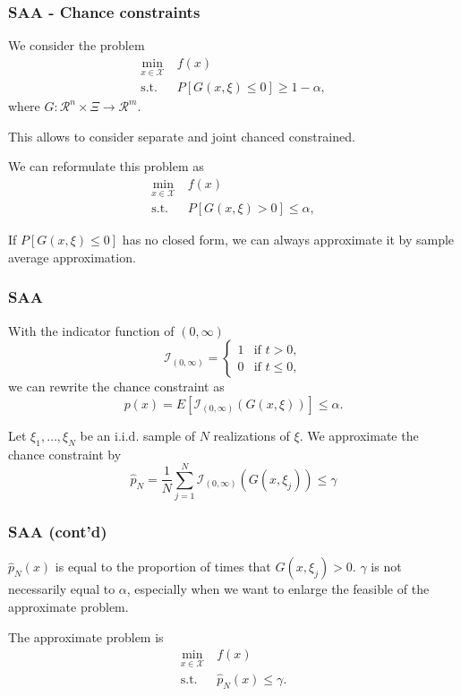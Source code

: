 \documentclass{beamer}
\begin{document}
\begin{frame}
	\frametitle{SAA - Chance constraints}
	
	We consider the problem
	\begin{align*}
		\min_{x \in \mathcal{X}}\ & f(x) \\
		\mbox{s.t. } & P[G(x,\xi) \leq 0] \geq 1 - \alpha,
	\end{align*}
	where $G: \mathcal{R}^n \times \Xi \rightarrow \mathcal{R}^m$.
	
	This allows to consider separate and joint chanced constrained.
	
	We can reformulate this problem as
	\begin{align*}
		\min_{x \in \mathcal{X}}\ & f(x) \\
		\mbox{s.t. } & P[G(x,\xi) > 0] \leq \alpha,
	\end{align*}
	
	
	\mbox{}
	
	If $P[G(x,\xi) \leq 0]$ has no closed form, we can always approximate it by sample average approximation.
	
\end{frame}

\begin{frame}
	\frametitle{SAA}
	
	With the indicator function of $(0,\infty)$
	\[
	\mathcal{I}_{(0,\infty)} =
	\begin{cases}
		1 & \mbox{if } t > 0,\\
		0 & \mbox{if } t \leq 0,
	\end{cases}
	\]
	we can rewrite the chance constraint as
	\[
	p(x) = E\left[ \mathcal{I}_{(0,\infty)} \left( G(x, \xi) \right) \right] \leq \alpha.
	\]
	
	Let $\xi_1,\ldots,\xi_N$ be an i.i.d. sample of $N$ realizations of $\xi$.
	We approximate the chance constraint by
	\[
	\hat{p}_N = \frac{1}{N} \sum_{j = 1}^N \mathcal{I}_{(0,\infty)} \left( G(x, \xi_j) \right) \leq \gamma
	\]
	
\end{frame}

\begin{frame}
	\frametitle{SAA (cont'd)}
	
	$\hat{p}_N(x)$ is equal to the proportion of times that $G(x,\xi_j) > 0$.
	$\gamma$ is not necessarily equal to $\alpha$, especially when we want to enlarge the feasible of the approximate problem.
	
	\mbox{}
	
	The approximate problem is
	\begin{align*}
		\min_{x \in \mathcal{X}}\ & f(x) \\
		\mbox{s.t. } & \hat{p}_N(x) \leq \gamma.
	\end{align*}
	
\end{frame}
\end{document}
